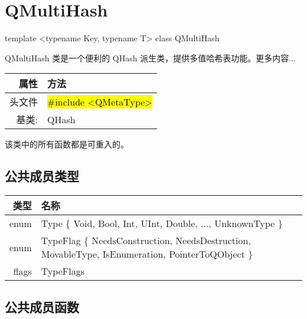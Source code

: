 \chapter{QMultiHash}

template <typename Key, typename T> class QMultiHash

QMultiHash 类是一个便利的 QHash 派生类，提供多值哈希表功能。更多内容...

\begin{tabular}{|r|l|}
	\hline
	属性 & 方法 \\
	\hline
    头文件  &	\hl{\#include <QMetaType>} \\
    \hline
    基类: & QHash    \\
	\hline
\end{tabular}

\begin{notice}
该类中的所有函数都是可重入的。
\end{notice}

\section{公共成员类型}

\begin{tabular}{|r|m{25em}|}   
\hline
类型 	& 名称 \\
\hline
enum &	Type \{ Void, Bool, Int, UInt, Double, ..., UnknownType \} \\
\hline
enum &	TypeFlag \{ NeedsConstruction, NeedsDestruction, MovableType, IsEnumeration, PointerToQObject \}\\
\hline
flags &	TypeFlags\\
\hline
\end{tabular}

\section{公共成员函数}

